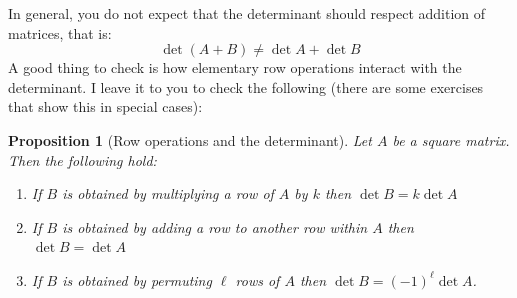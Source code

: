 \documentclass[12pt]{article}
\numberwithin{equation}{subsection}
\numberwithin{figure}{subsection}
\newtheorem{prop}[subsection]{Proposition}
\theoremstyle{note}
\begin{document}
In general, you do not expect that the determinant should respect addition of matrices, that is: \[ \det (A+B)\neq \det A+\det B\]
A good thing to check is how elementary row operations interact with the determinant. I leave it to you to check the following (there are some exercises that show this in special cases):

\begin{prop}[Row operations and the determinant] \label{prop-elm-mat} Let $A$ be a square matrix. Then the following hold:
\begin{enumerate}
	\item If $B$ is obtained by multiplying a row of $A$ by $k$ then $\det B=k\det A$
	\item If $B$ is obtained by adding a row to another row within $A$ then $\det B=\det A$
	\item If $B$ is obtained by permuting $\ell$ rows of $A$ then $\det B=(-1)^{\ell}\det A$. 
\end{enumerate}
\end{prop}
\end{document}
